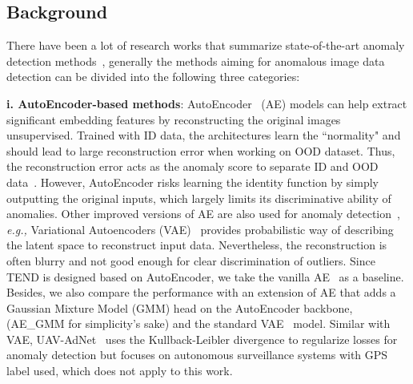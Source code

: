 \documentclass[12pt]{spieman}  %
\begin{document}
\begin{spacing}{2}
\section{Background}\label{sec:background}

There have been a lot of research works that summarize state-of-the-art anomaly detection methods~\cite{chalapathy2019deep:chala,lee2018simple:lee,ouyang2020video:video,hendrycks2018deep:hendry,cao2020benchmark:benchmark,di2019survey:di},  generally the methods aiming for anomalous image data detection can be divided into the following three categories:  

\noindent \textbf{i. AutoEncoder-based methods}: AutoEncoder~\cite{mcclelland1986parallel} (AE) models can help extract significant embedding features by reconstructing the original images unsupervised. Trained with ID data, the architectures learn the ``normality"  and should lead to large reconstruction error when working on OOD dataset. Thus, the reconstruction error acts as the anomaly score to separate ID and OOD data~\cite{sakurada2014anomaly:autoencoder,zhou2017anomaly:autoencoder,beggel2019robust:autoencoder}. However, AutoEncoder risks learning the identity function by simply outputting the original inputs, which largely limits its discriminative ability of anomalies. Other improved versions of AE are also used for anomaly detection~\cite{tagawa2015structured,pol2019anomaly,lupo2019variational,an2015variational}, \textit{e.g.,} Variational Autoencoders (VAE)~\cite{an2015variational:an} provides probabilistic way of describing the latent space to reconstruct input data. Nevertheless, the reconstruction is often blurry and not good enough for clear discrimination of outliers. Since TEND is designed based on AutoEncoder, we take the vanilla AE~\cite{mcclelland1986parallel} as a baseline. Besides, we also compare the performance with an extension of AE that adds a Gaussian Mixture Model (GMM) head on the AutoEncoder backbone, (AE\_GMM for simplicity's sake) and the standard VAE~\cite{an2015variational:an} model. Similar with VAE, UAV-AdNet~\cite{bozcan2020uav} uses the Kullback-Leibler divergence to regularize losses for anomaly detection but focuses on autonomous surveillance systems with GPS label used, which does not apply to this work.      


\end{spacing}
\end{document}
